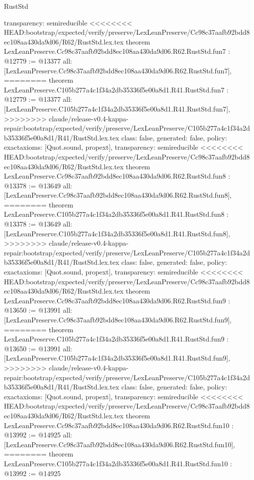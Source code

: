 \begin{lexlean}{RustStd}
\begin{coremodule}
{\begin{coremodule}
{{{{{{{{{{  transparency: semireducible
}
<<<<<<<< HEAD:bootstrap/expected/verify/preserve/LexLeanPreserve/Cc98c37aafb92bdd8ec108aa430da9d06/R62/RustStd.lex.tex
theorem LexLeanPreserve.Cc98c37aafb92bdd8ec108aa430da9d06.R62.RustStd.fun7 : @12779 := @13377 {
  all: [LexLeanPreserve.Cc98c37aafb92bdd8ec108aa430da9d06.R62.RustStd.fun7],
========
theorem LexLeanPreserve.C105b277a4c1f34a2db35336f5e00a8d1.R41.RustStd.fun7 : @12779 := @13377 {
  all: [LexLeanPreserve.C105b277a4c1f34a2db35336f5e00a8d1.R41.RustStd.fun7],
>>>>>>>> claude/release-v0.4-kappa-repair:bootstrap/expected/verify/preserve/LexLeanPreserve/C105b277a4c1f34a2db35336f5e00a8d1/R41/RustStd.lex.tex
  class: false,
  generated: false,
  policy: exact{axioms: [Quot.sound, propext]},
  transparency: semireducible
}
<<<<<<<< HEAD:bootstrap/expected/verify/preserve/LexLeanPreserve/Cc98c37aafb92bdd8ec108aa430da9d06/R62/RustStd.lex.tex
theorem LexLeanPreserve.Cc98c37aafb92bdd8ec108aa430da9d06.R62.RustStd.fun8 : @13378 := @13649 {
  all: [LexLeanPreserve.Cc98c37aafb92bdd8ec108aa430da9d06.R62.RustStd.fun8],
========
theorem LexLeanPreserve.C105b277a4c1f34a2db35336f5e00a8d1.R41.RustStd.fun8 : @13378 := @13649 {
  all: [LexLeanPreserve.C105b277a4c1f34a2db35336f5e00a8d1.R41.RustStd.fun8],
>>>>>>>> claude/release-v0.4-kappa-repair:bootstrap/expected/verify/preserve/LexLeanPreserve/C105b277a4c1f34a2db35336f5e00a8d1/R41/RustStd.lex.tex
  class: false,
  generated: false,
  policy: exact{axioms: [Quot.sound, propext]},
  transparency: semireducible
}
<<<<<<<< HEAD:bootstrap/expected/verify/preserve/LexLeanPreserve/Cc98c37aafb92bdd8ec108aa430da9d06/R62/RustStd.lex.tex
theorem LexLeanPreserve.Cc98c37aafb92bdd8ec108aa430da9d06.R62.RustStd.fun9 : @13650 := @13991 {
  all: [LexLeanPreserve.Cc98c37aafb92bdd8ec108aa430da9d06.R62.RustStd.fun9],
========
theorem LexLeanPreserve.C105b277a4c1f34a2db35336f5e00a8d1.R41.RustStd.fun9 : @13650 := @13991 {
  all: [LexLeanPreserve.C105b277a4c1f34a2db35336f5e00a8d1.R41.RustStd.fun9],
>>>>>>>> claude/release-v0.4-kappa-repair:bootstrap/expected/verify/preserve/LexLeanPreserve/C105b277a4c1f34a2db35336f5e00a8d1/R41/RustStd.lex.tex
  class: false,
  generated: false,
  policy: exact{axioms: [Quot.sound, propext]},
  transparency: semireducible
}
<<<<<<<< HEAD:bootstrap/expected/verify/preserve/LexLeanPreserve/Cc98c37aafb92bdd8ec108aa430da9d06/R62/RustStd.lex.tex
theorem LexLeanPreserve.Cc98c37aafb92bdd8ec108aa430da9d06.R62.RustStd.fun10 : @13992 := @14925 {
  all: [LexLeanPreserve.Cc98c37aafb92bdd8ec108aa430da9d06.R62.RustStd.fun10],
========
theorem LexLeanPreserve.C105b277a4c1f34a2db35336f5e00a8d1.R41.RustStd.fun10 : @13992 := @14925 {
}}}}}}}}}}}}}}
\end{coremodule}}
\end{coremodule}
\end{lexlean}
